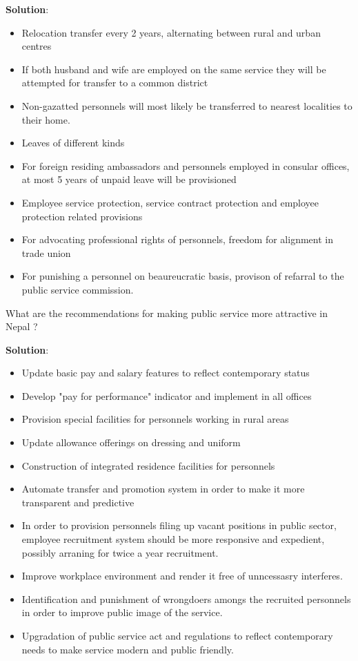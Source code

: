 \documentclass[
  openany]{book}
\newcommand{\question}{\item}
\newenvironment{solution}{ {\bfseries Solution}:}{}
\begin{document}
\begin{questions}
\begin{solution}
\begin{itemize}
\item Relocation transfer every 2 years, alternating between rural and urban centres
\item If both husband and wife are employed on the same service they will be attempted for transfer to a common district
\item Non-gazatted personnels will most likely be transferred to nearest localities to their home.
\item Leaves of different kinds
\item For foreign residing ambassadors and personnels employed in consular offices, at most 5 years of unpaid leave will be provisioned
\item Employee service protection, service contract protection and employee protection related provisions
\item For advocating professional rights of personnels, freedom for alignment in trade union
\item For punishing a personnel on beaureucratic basis, provison of refarral to the public service commission.
\end{itemize}

\end{solution}

\question What are the recommendations for making public service more attractive in Nepal ?

\begin{solution}
\begin{itemize}
\item Update basic pay and salary features to reflect contemporary status
\item Develop "pay for performance" indicator and implement in all offices
\item Provision special facilities for personnels working in rural areas
\item Update allowance offerings on dressing and uniform
\item Construction of integrated residence facilities for personnels
\item Automate transfer and promotion system in order to make it more transparent and predictive
\item In order to provision personnels filing up vacant positions in public sector, employee recruitment system should be more responsive and expedient, possibly arraning for twice a year recruitment.
\item Improve workplace environment and render it free of unncessasry interferes.
\item Identification and punishment of wrongdoers amongs the recruited personnels in order to improve public image of the service.
\item Upgradation of public service act and regulations to reflect contemporary needs to make service modern and public friendly.
\end{itemize}


\end{solution}
\end{questions}
\end{document}
